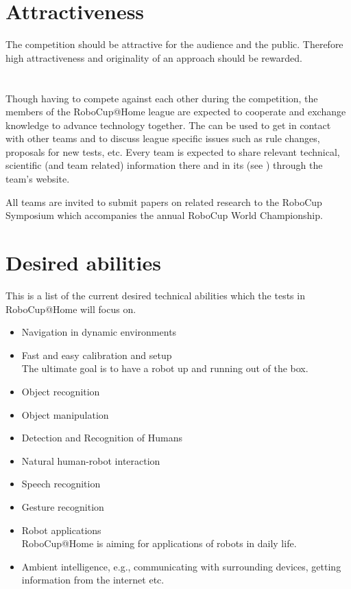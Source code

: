 \section{Attractiveness}
\label{concept:attractiveness}
The competition should be attractive for the audience and the public. Therefore high attractiveness and originality of an approach should be rewarded.

\section{}
\label{concept:community}
Though having to compete against each other during the competition, the members of the RoboCup@Home league are expected to cooperate and exchange knowledge to advance technology together. The  can be used to get in contact with other teams and to discuss league specific issues such as rule changes, proposals for new tests, etc.
Every team is expected to share relevant technical, scientific (and team related) information there and in its  (see ) through the team's website.

All teams are invited to submit papers on related research to the RoboCup Symposium which accompanies the annual RoboCup World Championship.

\section{Desired abilities}
\label{concept:desired_abilities}
This is a list of the current desired technical abilities which the tests in RoboCup@Home will focus on.

\begin{itemize}
\item Navigation in dynamic environments
\item Fast and easy calibration and setup \\ The ultimate goal is to have a robot up and running out of the box.
\item Object recognition
\item Object manipulation
\item Detection and Recognition of Humans
\item Natural human-robot interaction
\item Speech recognition
\item Gesture recognition
\item Robot applications \\ RoboCup@Home is aiming for applications of robots in daily life.
\item Ambient intelligence, e.g., communicating with surrounding devices, getting information from the internet etc.
\end{itemize}